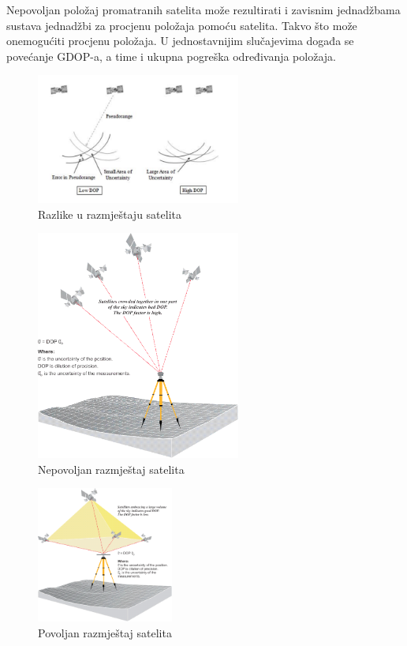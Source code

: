 \documentclass[a4paper,twoside,12pt]{memoir} %
\begin{document}
	Nepovoljan položaj promatranih satelita može rezultirati i zavisnim jednadžbama
	sustava jednadžbi za procjenu položaja pomoću satelita. Takvo što može onemogućiti procjenu položaja. U jednostavnijim slučajevima događa se povećanje GDOP-a, a time i ukupna pogreška određivanja položaja.
	\begin{figure}[H]
		\centering
		\includegraphics[width=0.6\textwidth]{DOP}
		\caption{Razlike u razmještaju satelita}
		\label{fig:DOP}
	\end{figure}%
	\begin{figure}[H]
		\centering
		\includegraphics[width=0.6\textwidth]{DOPLow}
		\caption{Nepovoljan razmještaj satelita}
		\label{fig:DOPLow}
	\end{figure}%
	\begin{figure}[H]
		\centering
		\includegraphics[width=0.4\textwidth]{DOPHigh}
		\caption{Povoljan razmještaj satelita}
		\label{fig:DOPHigh}
	\end{figure}
	
\end{document}

